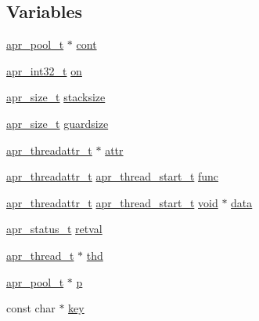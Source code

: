 \subsection*{Variables}
\begin{DoxyCompactItemize}
\item 
\hyperlink{structapr__pool__t}{apr\+\_\+pool\+\_\+t} $\ast$ \hyperlink{group__apr__thread__proc_ga859d4f4d4456dc729ea8b91a7512b928}{cont}
\item 
\hyperlink{group__apr__platform_ga21ef1e35fd3ff9be386f3cb20164ff02}{apr\+\_\+int32\+\_\+t} \hyperlink{group__apr__thread__proc_gade8f959a935ed315f9f55422c7de9903}{on}
\item 
\hyperlink{group__apr__platform_gaaa72b2253f6f3032cefea5712a27540e}{apr\+\_\+size\+\_\+t} \hyperlink{group__apr__thread__proc_ga878847af19e91616116c47a3bbe715ba}{stacksize}
\item 
\hyperlink{group__apr__platform_gaaa72b2253f6f3032cefea5712a27540e}{apr\+\_\+size\+\_\+t} \hyperlink{group__apr__thread__proc_ga45868b49435f659e4246d9588274c1e3}{guardsize}
\item 
\hyperlink{structapr__threadattr__t}{apr\+\_\+threadattr\+\_\+t} $\ast$ \hyperlink{group__apr__thread__proc_ga1f000a6f877b28975f25c365f0ffc5cc}{attr}
\item 
\hyperlink{structapr__threadattr__t}{apr\+\_\+threadattr\+\_\+t} \hyperlink{group__apr__thread__proc_gaa1f88d2a6fe971ac200e466cae5f63e0}{apr\+\_\+thread\+\_\+start\+\_\+t} \hyperlink{group__apr__thread__proc_ga40bf04c29bfb67c93dc7dc5075531285}{func}
\item 
\hyperlink{structapr__threadattr__t}{apr\+\_\+threadattr\+\_\+t} \hyperlink{group__apr__thread__proc_gaa1f88d2a6fe971ac200e466cae5f63e0}{apr\+\_\+thread\+\_\+start\+\_\+t} \hyperlink{group__MOD__ISAPI_gacd6cdbf73df3d9eed42fa493d9b621a6}{void} $\ast$ \hyperlink{group__apr__thread__proc_gae9e62656dd745200a9b641a99236ceb2}{data}
\item 
\hyperlink{group__apr__errno_gaa5105fa83cc322f09382292db8b47593}{apr\+\_\+status\+\_\+t} \hyperlink{group__apr__thread__proc_gabf8925f55d77c20b76e036eaf58f0c26}{retval}
\item 
\hyperlink{structapr__thread__t}{apr\+\_\+thread\+\_\+t} $\ast$ \hyperlink{group__apr__thread__proc_ga9abc6c7c01b67b5c7fb8a13fb333f126}{thd}
\item 
\hyperlink{structapr__pool__t}{apr\+\_\+pool\+\_\+t} $\ast$ \hyperlink{group__apr__thread__proc_ga0dbc18eca8a209ccd498d893ef54570d}{p}
\item 
const char $\ast$ \hyperlink{group__apr__thread__proc_gacd3d88da3c0e0313c3645ff34f62f542}{key}

\end{DoxyCompactItemize}
